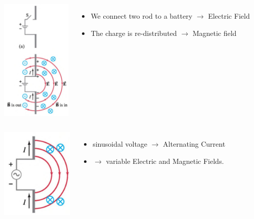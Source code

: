 \documentclass[]{beamer}
\begin{document}
\begin{frame}


   \begin{columns}[c]
   \column{2in}  %
  
  \begin{center}
  \includegraphics[height=2.3in]{images5/antenna1.jpg}
\end{center}


   \column{2.7in}


\begin{itemize}
\pause
\item We connect two rod to a battery $\rightarrow$ Electric Field 
\pause
\item  The charge is re-distributed $\rightarrow$  Magnetic field 

\end{itemize}

   \end{columns}


  \end{frame}





\begin{frame}


   \begin{columns}[c]
   \column{2in}  %
  
  \begin{center}
  \includegraphics[height=1.7in]{images5/antenna2.jpg}
\end{center}


   \column{2.7in}


\begin{itemize}
\pause
\item sinusoidal voltage   $\rightarrow$ Alternating Current
\pause
\item $\rightarrow$ variable Electric and Magnetic Fields.
\end{itemize}

   \end{columns}


  \end{frame}
\end{document}
